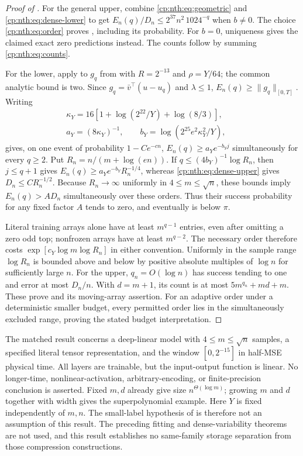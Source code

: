 \begin{proof}[Proof of ]
For the general upper, combine \eqref{cp:nth:eq:geometric}
and \eqref{cp:nth:eq:dense-lower} to get
\(E_n(q)/D_n\le2^{37}n^2\,1024^{-q}\) when \(b\ne0\). The choice
\eqref{cp:nth:eq:order} proves
, including its
probability. For \(b=0\), uniqueness gives the claimed exact zero
predictions instead. The counts follow by summing
\eqref{cp:nth:eq:counts}.

For the lower, apply  to
\(g_q\) from  with
\(R=2^{-13}\) and \(\rho=Y/64\); the common analytic bound is two. Since
\(g_q=\bar v^\top(u-u_q)\) and \(\lambda\le1\),
\(E_n(q)\ge\|g_q\|_{[0,T]}\). Writing \[\begin{gathered}
\kappa_Y=16[1+\log(2^{22}/Y)+\log(8/3)],\qquad\\
a_Y=(8\kappa_Y)^{-1},\qquad
b_Y=\log(2^{25}e^2\kappa_Y^2/Y),
\end{gathered}\] gives, on one event of probability \(1-Ce^{-cn}\),
\(E_n(q)\ge a_Ye^{-b_Yj}\) simultaneously for every \(q\ge2\). Put
\(R_n=n/(m+\log(en))\). If \(q\le(4b_Y)^{-1}\log R_n\), then
\(j\le q+1\) gives \(E_n(q)\ge a_Ye^{-b_Y}R_n^{-1/4}\), whereas
\eqref{cp:nth:eq:dense-upper} gives \(D_n\le C R_n^{-1/2}\).
Because \(R_n\to\infty\) uniformly in \(4\le m\le\sqrt n\), these bounds
imply \(E_n(q)>A D_n\) simultaneously over these orders. Thus their
success probability for any fixed factor \(A\) tends to zero, and
eventually is below \(\pi\).

Literal training arrays alone have at least \(m^{q-1}\) entries, even
after omitting a zero odd top; nonfrozen arrays have at least
\(m^{q-2}\). The necessary order therefore costs
\(\exp[c_Y\log m\log R_n]\) in either convention. Uniformly in the
sample range \(\log R_n\) is bounded above and below by positive
absolute multiples of \(\log n\) for sufficiently large \(n\). For the
upper, \(q_n=O(\log n)\) has success tending to one and error at most
\(D_n/n\). With \(d=m+1\), its count is at most \(5m^{q_n}+md+m\). These
prove  and its moving-array
assertion. For an adaptive order under a deterministic smaller budget,
every permitted order lies in the simultaneously excluded range, proving
the stated budget interpretation.
\end{proof}

The matched result concerns a deep-linear model with
\(4\le m\le\sqrt n\) samples, a specified literal tensor representation,
and the window \([0,2^{-15}]\)
in half-MSE physical time. All layers are trainable, but the
input-output function is linear. No longer-time, nonlinear-activation,
arbitrary-encoding, or finite-precision conclusion is asserted. Fixed
\(m,d\) already give size \(n^{\Theta(\log m)}\); growing \(m\) and \(d\)
together with width gives the superpolynomial example. Here \(Y\) is fixed
independently of \(m,n\). The small-label hypothesis of
 is therefore not an assumption of
this result. The preceding fitting and dense-variability theorems are not used,
and this result establishes no same-family storage separation from those
compression constructions.
